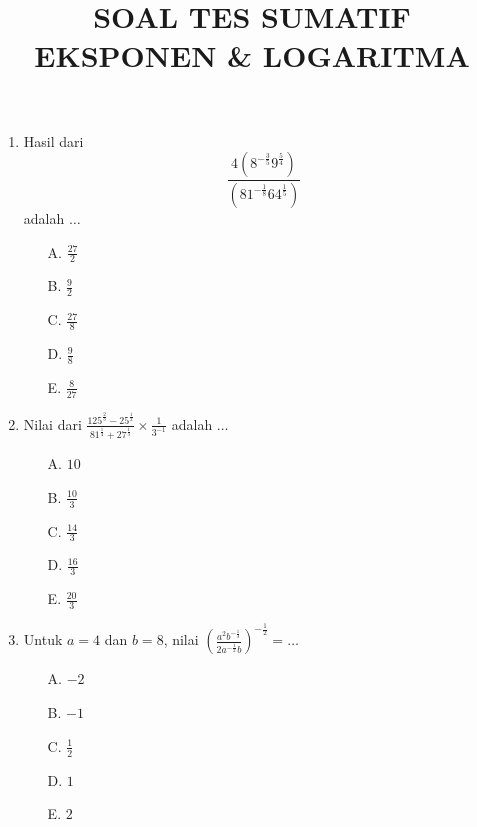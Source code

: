 \documentclass{article}
\title{\textbf{SOAL TES SUMATIF EKSPONEN \& LOGARITMA}}
\author{}
\date{}
\begin{document}
\onehalfspacing

\maketitle

\begin{enumerate}
    \item Hasil dari
    \[
        \frac{4\left(8^{-\frac{3}{5}}9^{\frac{5}{4}}\right)}
        {\left(81^{-\frac{1}{8}}64^{\frac{1}{5}}\right)}
    \]
    adalah $\dots$

    \begin{multicols}{3}
        \begin{enumerate}
            \item[A.] $\displaystyle \frac{27}{2}$
            \item[B.] $\displaystyle \frac{9}{2}$
            \item[C.] $\displaystyle \frac{27}{8}$
            \item[D.] $\displaystyle \frac{9}{8}$
            \item[E.] $\displaystyle \frac{8}{27}$
        \end{enumerate}
    \end{multicols}

    \item Nilai dari $\displaystyle \frac{125^{\frac{2}{3}}-25^{\frac{1}{2}}}{81^{\frac{1}{4}}+27^{\frac{1}{3}}}\times \frac{1}{3^{-1}}$ adalah $\dots$

    \begin{multicols}{3}
        \begin{enumerate}
            \item[A.] $10$
            \item[B.] $\displaystyle \frac{10}{3}$
            \item[C.] $\displaystyle \frac{14}{3}$
            \item[D.] $\displaystyle \frac{16}{3}$
            \item[E.] $\displaystyle \frac{20}{3}$
        \end{enumerate}
    \end{multicols}

    \item Untuk $a=4$ dan $b=8$, nilai $\displaystyle \left( \frac{a^2 b^{-\frac{1}{3}}}{2a^{-\frac{1}{2}}b} \right)^{-\frac{1}{2}}=\dots$

    \begin{multicols}{3}
        \begin{enumerate}
            \item[A.] $-2$
            \item[B.] $-1$
            \item[C.] $\displaystyle \frac{1}{2}$
            \item[D.] $1$
            \item[E.] $2$
        \end{enumerate}
    \end{multicols}


\end{enumerate}
\end{document}
